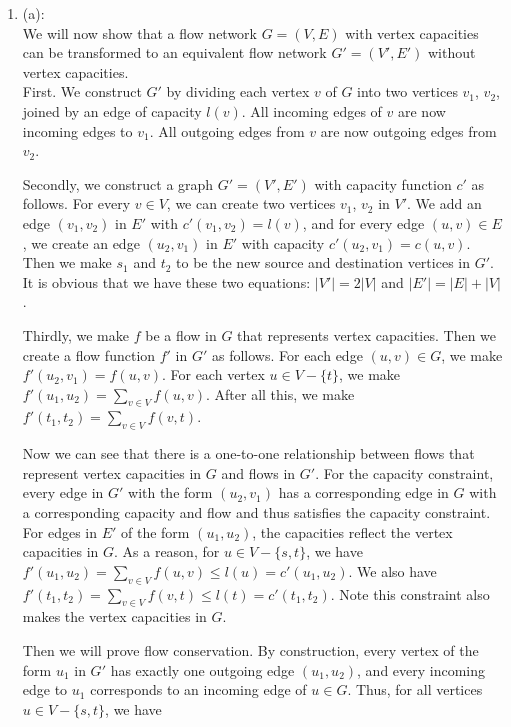 \documentclass[12pt,a4paper]{article}
\makeatletter
\newtheorem*{solution}{Solution}
\theoremstyle{definition}
\renewenvironment{solution}[1][Solution] {\par\pushQED{\qed}\normalfont\topsep6\p@\@plus6\p@\relax\trivlist\item[\hskip\labelsep\bfseries#1\@addpunct{.}]\ignorespaces}{\popQED\endtrivlist\@endpefalse} \makeatother
\makeatother
\begin{document}
\begin{enumerate}
    \begin{solution}
	
	(a):\\
	We will now show that a flow network $G = (V, E)$ with vertex capacities can be transformed to an equivalent flow network $G' = (V', E')$ without vertex capacities. \\
	First. We construct $G'$ by dividing each vertex $v$ of $G$ into two vertices $v_1$, $v_2$, joined by an edge of capacity $l(v)$. All incoming edges of $v$ are now incoming edges to $v_1$. All outgoing edges from $v$ are now outgoing edges from $v_2$.

    Secondly, we construct a graph $G' = (V', E')$ with capacity function $c'$ as follows.
    For every $v \in V$, we can create two vertices $v_1$, $v_2$ in $V'$. We add an edge $(v_1, v_2)$ in $E'$ with $c'(v_1, v_2) = l(v)$, and for every edge $(u, v) \in E$, we create an edge $(u_2, v_1)$ in $E'$ with capacity $c'(u_2, v_1) = c(u, v)$. Then we make $s_1$ and $t_2$ to be the new source and destination vertices in $G'$. It is obvious that we have these two equations: $|V'| = 2|V|$ and $|E'| = |E| + |V|$.

    Thirdly, we make $f$ be a flow in $G$ that represents vertex capacities. Then we create a flow function $f'$ in $G'$ as follows. For each edge $(u, v) \in G$, we make $f'(u_2, v_1) = f(u, v)$. For each vertex $u \in V - \{t\}$, we make $f'(u_1, u_2) = \sum_{v \in V} f(u, v)$. After all this, we make $f'(t_1, t_2) = \sum_{v \in V} f(v, t)$.

    Now we can see that there is a one-to-one relationship between flows that represent vertex capacities in $G$ and flows in $G'$. For the capacity constraint, every edge in $G'$ with the form $(u_2, v_1)$ has a corresponding edge in $G$ with a corresponding capacity and flow and thus satisfies the capacity constraint. For edges in $E'$ of the form $(u_1, u_2)$, the capacities reflect the vertex capacities in $G$. As a reason, for $u \in V - \{s, t\}$, we have $f'(u_1, u_2) = \sum_{v \in V} f(u, v) \le l(u) = c'(u_1, u_2)$. We also have $f'(t_1, t_2) = \sum_{v \in V} f(v, t) \le l(t) = c'(t_1, t_2)$. Note this constraint also makes the vertex capacities in $G$.

    Then we will prove flow conservation. By construction, every vertex of the form $u_1$ in $G'$ has exactly one outgoing edge $(u_1, u_2)$, and every incoming edge to $u_1$ corresponds to an incoming edge of $u \in G$. Thus, for all vertices $u \in V - \{s, t\}$, we have


\end{solution}
\end{enumerate}
\end{document}
